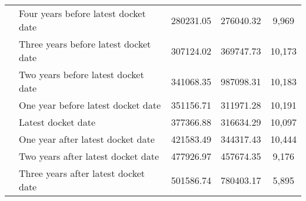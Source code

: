 \begin{tabular}{llccc}
 & Four years before latest docket date & 280231.05 & 276040.32 & 9,969 \\
 & Three years before latest docket date & 307124.02 & 369747.73 & 10,173 \\
 & Two years before latest docket date & 341068.35 & 987098.31 & 10,183 \\
 & One year before latest docket date & 351156.71 & 311971.28 & 10,191 \\
 & Latest docket date & 377366.88 & 316634.29 & 10,097 \\
 & One year after latest docket date & 421583.49 & 344317.43 & 10,444 \\
 & Two years after latest docket date & 477926.97 & 457674.35 & 9,176 \\
 & Three years after latest docket date & 501586.74 & 780403.17 & 5,895 \\
\cline{1-5}
\bottomrule
\end{tabular}
